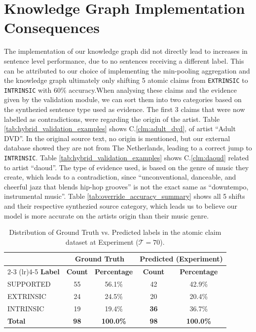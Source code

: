 \section{Knowledge Graph Implementation Consequences}
The implementation of our knowledge graph did not directly lead to increases in sentence level performance, due to no sentences receiving a different label. This can be attributed to our choice of implementing the min-pooling aggregation and the knowledge graph ultimately only shifting 5 atomic claims from \texttt{EXTRINSIC} to \texttt{INTRINSIC} with 60\% accuracy.When analysing these claims and the evidence given by the validation module, we can sort them into two categories based on the synthezied sentence type used as evidence. The first 3 claims that were now labelled as contradictions, were regarding the origin of the artist. Table \ref{tab:hybrid_validation_examples} shows C.\ref{clm:adult_dvd}, of artist ``Adult DVD''. In the original source text, no origin is mentioned, but our external database showed they are not from The Netherlands, leading to a correct jump to \texttt{INTRINSIC}. Table \ref{tab:hybrid_validation_examples} shows C.\ref{clm:daoud} related to artist ``daoud''. The type of evidence used, is based on the genre of music they create, which leads to a contradiction, since ``unconventional, danceable, and cheerful jazz that blends hip-hop grooves'' is not the exact same as ``downtempo, instrumental music''. Table \ref{tab:override_accuracy_summary} shows all 5 shifts and their respective synthezied source category, which leads us to believe our model is more accurate on the artists origin than their music genre. 

  \begin{table}[ht]
    \centering
    \caption{Distribution of Ground Truth vs. Predicted labels in the atomic claim dataset at Experiment ($\mathcal{T} = 70$).}
    \label{tab:atomic_label_distribution_experiment}
    \begin{tabular}{lcccc}
        \toprule
        & \multicolumn{2}{c}{\textbf{Ground Truth}} & \multicolumn{2}{c}{\textbf{Predicted (Experiment)}} \\
        \cmidrule(lr){2-3} \cmidrule(lr){4-5}
        \textbf{Label} & \textbf{Count} & \textbf{Percentage} & \textbf{Count} & \textbf{Percentage} \\
        \midrule
        SUPPORTED & 55 & 56.1\% & 42 & 42.9\% \\
        EXTRINSIC & 24 & 24.5\% & 20 & 20.4\% \\
        INTRINSIC & 19 & 19.4\% & \textbf{36} & 36.7\% \\
        \midrule
        \textbf{Total} & \textbf{98} & \textbf{100.0\%} & \textbf{98} & \textbf{100.0\%} \\
        \bottomrule
    \end{tabular}
\end{table}


